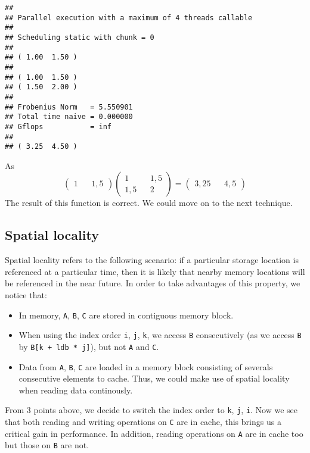 \documentclass[
  12pt,
  xcolor = usenames,dvipsnames]{article}
\newcommand{\passthrough}[1]{#1}
\providecommand{\tightlist}{%
  \setlength{\itemsep}{0pt}\setlength{\parskip}{0pt}}
\begin{document}
\begin{lstlisting}
## 
## Parallel execution with a maximum of 4 threads callable
## 
## Scheduling static with chunk = 0
## 
## ( 1.00  1.50 )
## 
## ( 1.00  1.50 )
## ( 1.50  2.00 )
## 
## Frobenius Norm   = 5.550901
## Total time naive = 0.000000
## Gflops           = inf
## 
## ( 3.25  4.50 )
\end{lstlisting}

As
\[
\begin{pmatrix}
1 && 1,5
\end{pmatrix}\begin{pmatrix}
1 && 1,5\\
1,5 && 2
\end{pmatrix}=\begin{pmatrix}
3,25 && 4,5
\end{pmatrix}
\]
The result of this function is correct. We could move on to the next technique.

\hypertarget{spatial-locality}{%
\subsection{Spatial locality}\label{spatial-locality}}

Spatial locality refers to the following scenario: if a particular storage location is referenced at a particular time, then it is likely that nearby memory locations will be referenced in the near future. In order to take advantages of this property, we notice that:

\begin{itemize}
\tightlist
\item
  In memory, \passthrough{\lstinline!A!}, \passthrough{\lstinline!B!}, \passthrough{\lstinline!C!} are stored in contiguous memory block.
\item
  When using the index order \passthrough{\lstinline!i!}, \passthrough{\lstinline!j!}, \passthrough{\lstinline!k!}, we access \passthrough{\lstinline!B!} consecutively (as we access \passthrough{\lstinline!B!} by \passthrough{\lstinline!B[k + ldb * j]!}), but not \passthrough{\lstinline!A!} and \passthrough{\lstinline!C!}.
\item
  Data from \passthrough{\lstinline!A!}, \passthrough{\lstinline!B!}, \passthrough{\lstinline!C!} are loaded in a memory block consisting of severals consecutive elements to cache. Thus, we could make use of spatial locality when reading data continously.
\end{itemize}

From 3 points above, we decide to switch the index order to \passthrough{\lstinline!k!}, \passthrough{\lstinline!j!}, \passthrough{\lstinline!i!}. Now we see that both reading and writing operations on \passthrough{\lstinline!C!} are in cache, this brings us a critical gain in performance. In addition, reading operations on \passthrough{\lstinline!A!} are in cache too but those on \passthrough{\lstinline!B!} are not.
\end{document}
